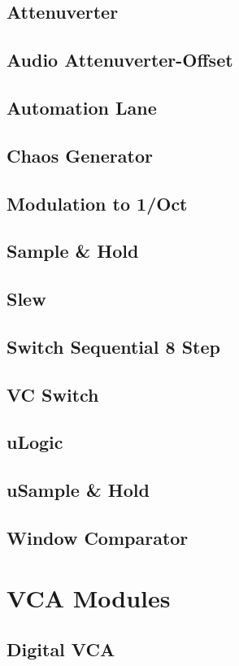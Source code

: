 \documentclass[11pt]{book}
\begin{document}
\section{Attenuverter}
\section{Audio Attenuverter-Offset}
\section{Automation Lane}
\section{Chaos Generator}
\section{Modulation to 1/Oct}
\section{Sample \& Hold}
\section{Slew}
\section{Switch Sequential 8 Step}
\section{VC Switch}
\section{uLogic}
\section{uSample \& Hold}
\section{Window Comparator}

\chapter{VCA Modules}
\section{Digital VCA}
\end{document}
